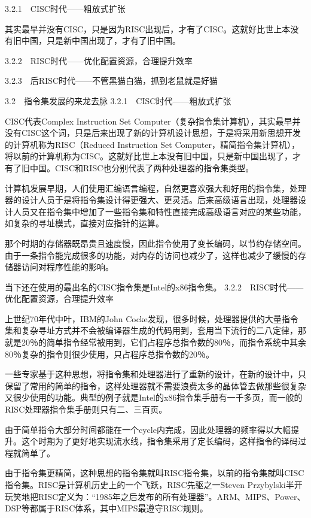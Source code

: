 \documentclass[12pt,UTF8]{ctexbook}
\begin{document}
3.2.1　CISC时代——粗放式扩张

其实最早并没有CISC，只是因为RISC出现后，才有了CISC。这就好比世上本没有旧中国，只是新中国出现了，才有了旧中国。

3.2.2　RISC时代——优化配置资源，合理提升效率

3.2.3　后RISC时代——不管黑猫白猫，抓到老鼠就是好猫


3.2　指令集发展的来龙去脉
3.2.1　CISC时代——粗放式扩张

CISC代表Complex Instruction Set Computer（复杂指令集计算机），其实最早并没有CISC这个词，只是后来出现了新的计算机设计思想，于是将采用新思想开发的计算机称为RISC（Reduced Instruction Set Computer，精简指令集计算机），将以前的计算机称为CISC。这就好比世上本没有旧中国，只是新中国出现了，才有了旧中国。CISC和RISC也分别代表了两种处理器的指令集类型。

计算机发展早期，人们使用汇编语言编程，自然更喜欢强大和好用的指令集，处理器的设计人员于是将指令集设计得更强大、更灵活。后来高级语言出现，处理器设计人员又在指令集中增加了一些指令集和特性直接完成高级语言对应的某些功能，如复杂的寻址模式，直接对应指针的运算。

那个时期的存储器既昂贵且速度慢，因此指令使用了变长编码，以节约存储空间。由于一条指令能完成很多的功能，对内存的访问也减少了，这样也减少了缓慢的存储器访问对程序性能的影响。

当下还在使用的最出名的CISC指令集是Intel的x86指令集。
3.2.2　RISC时代——优化配置资源，合理提升效率

上世纪70年代中叶，IBM的John Cocke发现，很多时候，处理器提供的大量指令集和复杂寻址方式并不会被编译器生成的代码用到，套用当下流行的二八定律，那就是20％的简单指令经常被用到，它们占程序总指令数的80％，而指令系统中其余80％复杂的指令则很少使用，只占程序总指令数的20％。

一些专家基于这种思想，将指令集和处理器进行了重新的设计，在新的设计中，只保留了常用的简单的指令，这样处理器就不需要浪费太多的晶体管去做那些很复杂又很少使用的功能。典型的例子就是Intel的x86指令集手册有一千多页，而一般的RISC处理器指令集手册则只有二、三百页。

由于简单指令大部分时间都能在一个cycle内完成，因此处理器的频率得以大幅提升。这个时期为了更好地实现流水线，指令集采用了定长编码，这样指令的译码过程就简单了。

由于指令集更精简，这种思想的指令集就叫RISC指令集，以前的指令集就叫CISC指令集。RISC是计算机历史上的一个飞跃，RISC先驱之一Steven Przybylski半开玩笑地把RISC定义为：“1985年之后发布的所有处理器”。ARM、MIPS、Power、DSP等都属于RISC体系，其中MIPS最遵守RISC规则。
\end{document}
